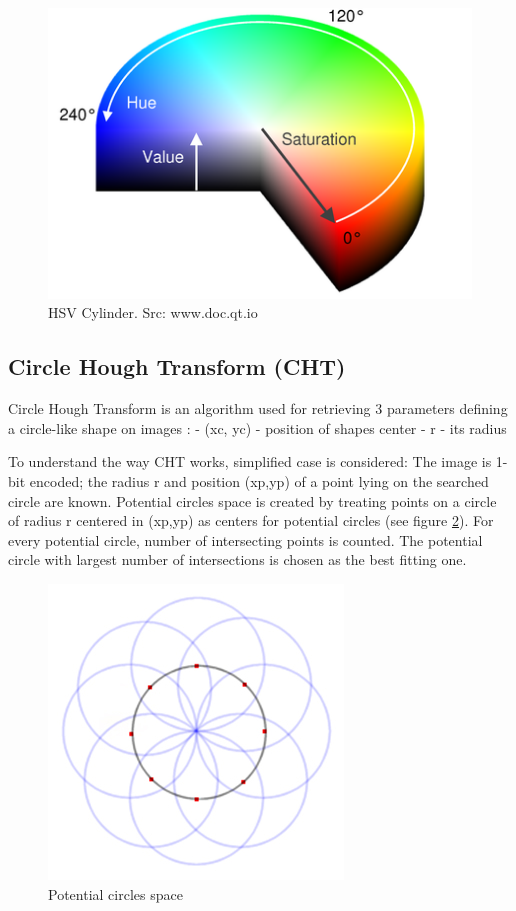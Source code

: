 \documentclass[12pt,twoside,a4paper]{article}
\begin{document}
\begin{figure}[H]
\centering
\includegraphics[width=0.4\paperwidth]{hsv}
\caption{HSV Cylinder. Src: www.doc.qt.io}\label{fig:hsv}
\end{figure}


\subsection{Circle Hough Transform (CHT)}
Circle Hough Transform is an algorithm used for retrieving 3 parameters defining a circle-like shape on images\cite{hgtcv} : 
- (xc, yc) - position of shapes center
- r - its radius

To understand the way CHT works, simplified case is considered:
The image is 1-bit encoded; the radius r and position (xp,yp) of a point lying on the searched circle are known.
Potential circles space is created by treating points on a circle of radius r centered in (xp,yp) as centers for potential circles (see figure \ref{fig:space}).
For every potential circle, number of intersecting points is counted.
The potential circle with largest number of intersections is chosen as the best fitting one.

 
\begin{figure}[H]
\centering
\includegraphics[width=0.4\paperwidth]{space}
\caption{Potential circles space\cite{craters}}\label{fig:space}
\end{figure}
\end{document}
